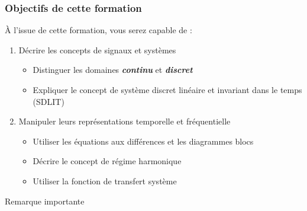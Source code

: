 \documentclass[a4paper,11pt]{beamer}
\begin{document}

\begin{frame}[plain]
\frametitle{Objectifs de cette formation}
\center
À l'issue de cette formation, vous serez capable de :
\vspace{0.25cm}

\begin{enumerate}
  \item Décrire les concepts de signaux et systèmes
 		\begin{itemize}
 		  \item Distinguer les domaines \textit{\textbf{continu}} et
 		  \textit{\textbf{discret}}
 		  \item Expliquer le concept de système discret linéaire et invariant dans le
 		  temps (SDLIT)
 		\end{itemize}
  \item Manipuler leurs représentations temporelle et fréquentielle
  	    \begin{itemize}
  	      \item Utiliser les équations aux différences et les diagrammes blocs
  	      \item Décrire le concept de régime harmonique
 		  \item Utiliser la fonction de transfert système
 		\end{itemize}
\end{enumerate}
\begin{exampleblock}{Remarque importante}
\end{exampleblock}
\end{frame}
\end{document}
